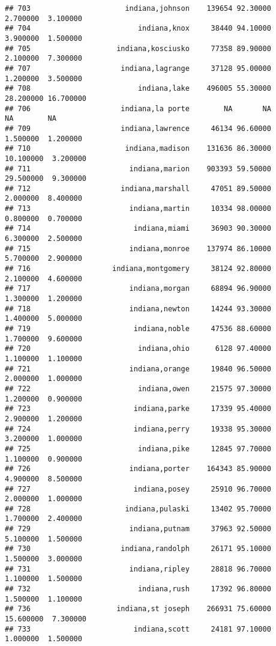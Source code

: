 \documentclass[
]{article}
\begin{document}
\begin{verbatim}
## 703                      indiana,johnson    139654 92.30000  2.700000  3.100000
## 704                         indiana,knox     38440 94.10000  3.900000  1.500000
## 705                    indiana,kosciusko     77358 89.90000  2.100000  7.300000
## 707                     indiana,lagrange     37128 95.00000  1.200000  3.500000
## 708                         indiana,lake    496005 55.30000 28.200000 16.700000
## 706                     indiana,la porte        NA       NA        NA        NA
## 709                     indiana,lawrence     46134 96.60000  1.500000  1.200000
## 710                      indiana,madison    131636 86.30000 10.100000  3.200000
## 711                       indiana,marion    903393 59.50000 29.500000  9.300000
## 712                     indiana,marshall     47051 89.50000  2.000000  8.400000
## 713                       indiana,martin     10334 98.00000  0.800000  0.700000
## 714                        indiana,miami     36903 90.30000  6.300000  2.500000
## 715                       indiana,monroe    137974 86.10000  5.700000  2.900000
## 716                   indiana,montgomery     38124 92.80000  2.100000  4.600000
## 717                       indiana,morgan     68894 96.90000  1.300000  1.200000
## 718                       indiana,newton     14244 93.30000  1.400000  5.000000
## 719                        indiana,noble     47536 88.60000  1.700000  9.600000
## 720                         indiana,ohio      6128 97.40000  1.100000  1.100000
## 721                       indiana,orange     19840 96.50000  2.000000  1.000000
## 722                         indiana,owen     21575 97.30000  1.200000  0.900000
## 723                        indiana,parke     17339 95.40000  2.900000  1.200000
## 724                        indiana,perry     19338 95.30000  3.200000  1.000000
## 725                         indiana,pike     12845 97.70000  1.100000  0.900000
## 726                       indiana,porter    164343 85.90000  4.900000  8.500000
## 727                        indiana,posey     25910 96.70000  2.000000  1.000000
## 728                      indiana,pulaski     13402 95.70000  1.700000  2.400000
## 729                       indiana,putnam     37963 92.50000  5.100000  1.500000
## 730                     indiana,randolph     26171 95.10000  1.500000  3.000000
## 731                       indiana,ripley     28818 96.70000  1.100000  1.500000
## 732                         indiana,rush     17392 96.80000  1.500000  1.100000
## 736                    indiana,st joseph    266931 75.60000 15.600000  7.300000
## 733                        indiana,scott     24181 97.10000  1.000000  1.500000

\end{verbatim}
\end{document}
